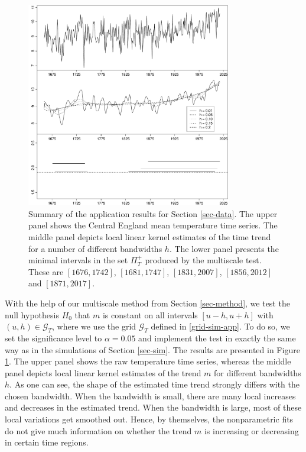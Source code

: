 \begin{figure}[t]
\centering
\includegraphics[width=0.8\textwidth]{Plots/temperature_data.pdf}
\caption{Summary of the application results for Section \ref{sec-data}. The upper panel shows the Central England mean temperature time series. The middle panel depicts local linear kernel estimates of the time trend for a number of different bandwidths $h$. The lower panel presents the minimal intervals in the set $\Pi_T^+$ produced by the multiscale test. These are $[1676,1742]$, $[1681,1747]$, $[1831,2007]$, $[1856, 2012]$ and $[1871,2017]$.}\label{plot-results-app1}
\end{figure}


With the help of our multiscale method from Section \ref{sec-method}, we test the null hypothesis $H_0$ that $m$ is constant on all intervals $[u-h,u+h]$ with $(u,h) \in \mathcal{G}_T$, where we use the grid $\mathcal{G}_T$ defined in \eqref{grid-sim-app}. To do so, we set the significance level to $\alpha = 0.05$ and implement the test in exactly the same way as in the simulations of Section \ref{sec-sim}. The results are presented in Figure \ref{plot-results-app1}. The upper panel shows the raw temperature time series, whereas the middle panel depicts local linear kernel estimates of the trend $m$ for different bandwidths $h$. As one can see, the shape of the estimated time trend strongly differs with the chosen bandwidth. When the bandwidth is small, there are many local increases and decreases in the estimated trend. When the bandwidth is large, most of these local variations get smoothed out. Hence, by themselves, the nonparametric fits do not give much information on whether the trend $m$ is increasing or decreasing in certain time regions. 


